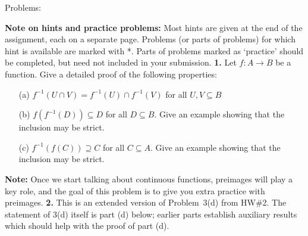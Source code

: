\documentclass[11pt]{amsart}
\begin{document}
\skv
\bf\centerline{Problems: }\rm
\skv
{\bf Note on hints and practice problems: } Most hints are given at the end of the assignment, each on a separate page.
Problems (or parts of problems) for which hint is available are marked with *. Parts of problems marked as `practice'
should be completed, but need not included in your submission.
\skv
{\bf 1.}  Let $f:A\to B$ be a function. Give a detailed proof of the following properties:
\begin{itemize}
\item[(a)] $f^{-1}(U\cap V)=f^{-1}(U)\cap f^{-1}(V)$ for all $U,V\subseteq B$
\item[(b)] $f(f^{-1}(D))\subseteq D$ for all $D\subseteq B$. Give an example showing that the inclusion may be strict.
\item[(c)] $f^{-1}(f(C))\supseteq C$ for all $C\subseteq A$. Give an example showing that the inclusion may be strict.
\end{itemize}
{\bf Note:} Once we start talking about continuous functions, preimages will play a key role, and the goal of this problem
is to give you extra practice with preimages.
\skv
{\bf 2.} This is an extended version of Problem~3(d) from HW\#2. The statement of 3(d) itself is part (d) below; earlier parts establish auxiliary results which should help with the proof of part (d).
\end{document}
